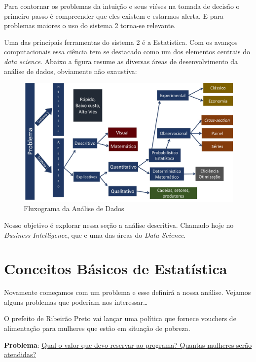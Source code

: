 \documentclass[
  letterpaper,
  DIV=11,
  numbers=noendperiod]{scrreprt}
\begin{document}
Para contornar os problemas da intuição e seus viéses na tomada de
decisão o primeiro passo é compreender que eles existem e estarmos
alerta. E para problemas maiores o uso do sistema 2 torna-se relevante.

Uma das principais ferramentas do sistema 2 é a Estatística. Com os
avanços computacionais essa ciência tem se destacado como um dos
elementos centrais do \emph{data science}. Abaixo a figura resume as
diversas áreas de desenvolvimento da análise de dados, obviamente não
exaustiva:

\begin{figure}[H]

{\centering \includegraphics[width=0.8\linewidth,height=\textheight,keepaspectratio]{figuras/analisedados.jpg}

}

\caption{Fluxograma da Análise de Dados}

\end{figure}%

Nosso objetivo é explorar nessa seção a análise descritiva. Chamado hoje
no \emph{Business Intelligence}, que e uma das áreas do \emph{Data
Science}.

\section{Conceitos Básicos de
Estatística}\label{conceitos-buxe1sicos-de-estatuxedstica}

Novamente começamos com um problema e esse definirá a nossa análise.
Vejamos alguns problemas que poderiam nos interessar\ldots{}

\begin{tcolorbox}[enhanced jigsaw, leftrule=.75mm, coltitle=black, colframe=quarto-callout-note-color-frame, toprule=.15mm, opacitybacktitle=0.6, bottomtitle=1mm, bottomrule=.15mm, titlerule=0mm, toptitle=1mm, title=\textcolor{quarto-callout-note-color}{\faInfo}\hspace{0.5em}{Problema 1}, arc=.35mm, breakable, opacityback=0, colbacktitle=quarto-callout-note-color!10!white, colback=white, left=2mm, rightrule=.15mm]

O prefeito de Ribeirão Preto vai lançar uma política que fornece
vouchers de alimentação para mulheres que estão em situação de pobreza.

\textbf{Problema}: \ul{Qual o valor que devo reservar ao programa?
Quantas mulheres serão atendidas?}

\end{tcolorbox}
\end{document}
